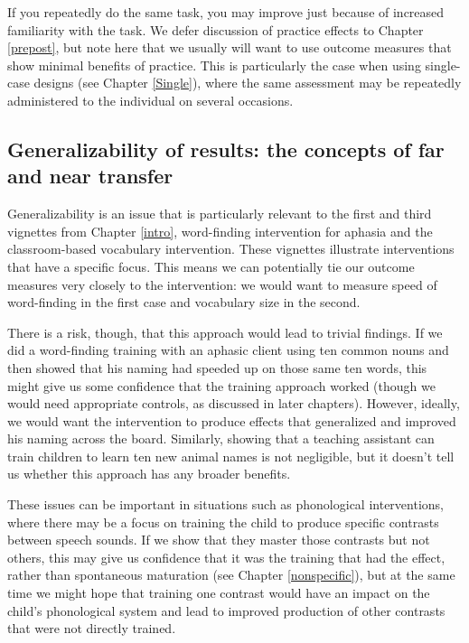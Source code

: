 \documentclass{krantz}
\begin{document}
If you repeatedly do the same task, you may improve just because of increased familiarity with the task. We defer discussion of practice effects to Chapter \ref{prepost}, but note here that we usually will want to use outcome measures that show minimal benefits of practice. This is particularly the case when using single-case designs (see Chapter \ref{Single}), where the same assessment may be repeatedly administered to the individual on several occasions.

\hypertarget{generalizability-of-results-the-concepts-of-far-and-near-transfer}{%
\subsection{Generalizability of results: the concepts of far and near transfer}\label{generalizability-of-results-the-concepts-of-far-and-near-transfer}}

Generalizability is an issue that is particularly relevant to the first and third vignettes from Chapter \ref{intro}, word-finding intervention for aphasia and the classroom-based vocabulary intervention. These vignettes illustrate interventions that have a specific focus. This means we can potentially tie our outcome measures very closely to the intervention: we would want to measure speed of word-finding in the first case and vocabulary size in the second.

There is a risk, though, that this approach would lead to trivial findings. If we did a word-finding training with an aphasic client using ten common nouns and then showed that his naming had speeded up on those same ten words, this might give us some confidence that the training approach worked (though we would need appropriate controls, as discussed in later chapters). However, ideally, we would want the intervention to produce effects that generalized and improved his naming across the board. Similarly, showing that a teaching assistant can train children to learn ten new animal names is not negligible, but it doesn't tell us whether this approach has any broader benefits.

These issues can be important in situations such as phonological interventions, where there may be a focus on training the child to produce specific contrasts between speech sounds. If we show that they master those contrasts but not others, this may give us confidence that it was the training that had the effect, rather than spontaneous maturation (see Chapter \ref{nonspecific}), but at the same time we might hope that training one contrast would have an impact on the child's phonological system and lead to improved production of other contrasts that were not directly trained.
\end{document}
